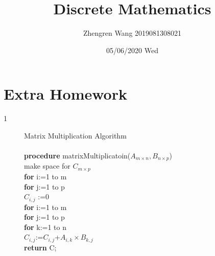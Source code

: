 \documentclass[UTF8]{article}
\title{Discrete Mathematics}
\author{Zhengren Wang 2019081308021}
\date{05/06/2020 Wed }
\begin{document}
\maketitle 

\part{Extra Homework}
\begin{description}
    \item[1]Matrix Multiplication Algorithm\\\\

        \hspace*{1cm}        \textbf{procedure} matrixMultiplicatoin($A_{m \times n} ,B_{n \times p}$)           \\
        \hspace*{1cm}        make space for $C_{m \times p}$                                                     \\
        \hspace*{1cm}        \textbf{for} i:=1 to m                                                              \\
        \hspace*{2cm}            \textbf{for} j:=1 to p                                                          \\
        \hspace*{3cm}            $C_{i,j}$ :=0                                                                    \\
        \hspace*{1cm}        \textbf{for} i:=1 to m                                                              \\
        \hspace*{2cm}            \textbf{for} j:=1 to p                                                          \\
        \hspace*{3cm}                \textbf{for} k:=1 to n                                                       \\
        \hspace*{4cm}                $C_{i,j}$:=$C_{i,j}$+$A_{i,k} \times B_{k,j}$                               \\
        \hspace*{1cm}        \textbf{return} C;                                                                  \\

        
\end{description}
\end{document}
